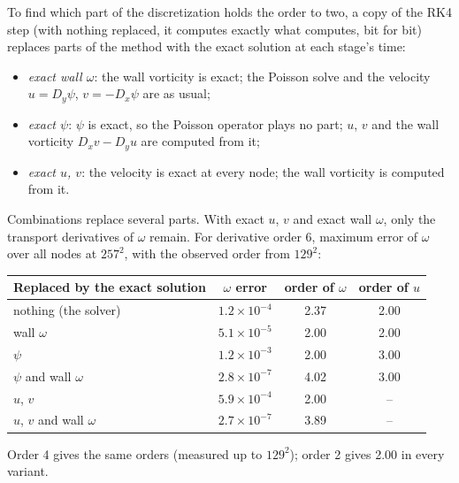 \documentclass[11pt,a4paper]{article}
\newcommand{\code}[1]{\texttt{\detokenize{#1}}}
\begin{document}
To find which part of the discretization holds the order to two, a copy of the RK4 step (with nothing replaced, it computes exactly what \code{step()} computes, bit for bit) replaces parts of the method with the exact solution at each stage's time:
\begin{itemize}[leftmargin=2em]
  \item \emph{exact wall $\omega$}: the wall vorticity is exact; the Poisson solve and the velocity $u=D_y\psi$, $v=-D_x\psi$ are as usual;
  \item \emph{exact $\psi$}: $\psi$ is exact, so the Poisson operator plays no part; $u$, $v$ and the wall vorticity $D_xv-D_yu$ are computed from it;
  \item \emph{exact $u$, $v$}: the velocity is exact at every node; the wall vorticity is computed from it.
\end{itemize}
Combinations replace several parts.  With exact $u$, $v$ and exact wall $\omega$, only the transport derivatives of $\omega$ remain.  For derivative order 6, maximum error of $\omega$ over all nodes at $257^2$, with the observed order from $129^2$:
\begin{center}
\begin{tabular}{lccc}
\toprule
Replaced by the exact solution & $\omega$ error & order of $\omega$ & order of $u$ \\
\midrule
nothing (the solver) & $1.2\times10^{-4}$ & 2.37 & 2.00 \\
wall $\omega$ & $5.1\times10^{-5}$ & 2.00 & 2.00 \\
$\psi$ & $1.2\times10^{-3}$ & 2.00 & 3.00 \\
$\psi$ and wall $\omega$ & $2.8\times10^{-7}$ & 4.02 & 3.00 \\
$u$, $v$ & $5.9\times10^{-4}$ & 2.00 & -- \\
$u$, $v$ and wall $\omega$ & $2.7\times10^{-7}$ & 3.89 & -- \\
\bottomrule
\end{tabular}
\end{center}
Order 4 gives the same orders (measured up to $129^2$); order 2 gives 2.00 in every variant.
\end{document}
